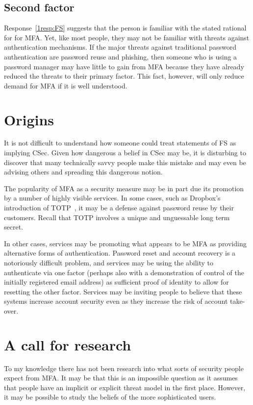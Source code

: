 \documentclass{soups}
\newcommand{\prop}[1]{\textsf{#1}}
\begin{document}
\subsection{Second factor}

Response~\ref{1resp:FS} suggests that the person is familiar with the stated rational for for MFA\@.
Yet, like most people, they may not be familiar with threats against authentication mechanisms.
If the major threats against traditional password authentication are password reuse and phishing,
then someone who is using a password manager may have little to gain from
MFA because they have already reduced the threats to their primary factor.
This fact, however, will only reduce demand for MFA if it is well understood.

\section{Origins}

It is not difficult to understand how someone could treat statements of  \prop{FS} as implying  \prop{CSec}.
Given how dangerous a belief in \prop{CSec} may be, it is disturbing to discover that
many technically savvy people make this mistake and may even be advising others and spreading this dangerous notion.

The popularity of MFA as a security measure may be in part due its promotion by a number of highly visible services.
In some cases,
such as Dropbox's introduction of TOTP~\autocite{Dropbox12:reuse},
it may be a defense against password reuse by their customers.
Recall that TOTP involves a unique and unguessable long term secret.

In other cases, services may be promoting what appears to be MFA as providing
alternative forms of authentication. 
Password reset and account recovery is a notoriously difficult problem,
and services may be using the ability to authenticate via one factor 
(perhaps also with a demonstration of control of the initially registered email address)
as sufficient proof of identity to allow for resetting the other factor.
Services may be inviting people to believe that these systems increase account security even as they increase the risk of account take-over.

\section{A call for research}

To my knowledge there has not been research into what sorts of security people expect from MFA\@.
It may be that this is an impossible question as it assumes that people
have an implicit or explicit threat model in the first place.
However, it may be possible to study the beliefs of the more sophisticated users.
\end{document}
